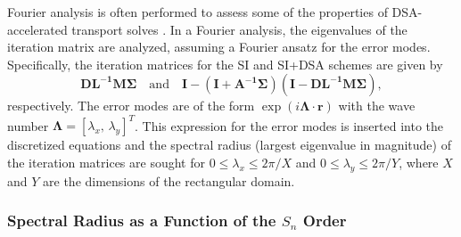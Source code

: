 \documentclass[preprint,10pt]{elsarticle}
\newcommand\bs{\boldsymbol}
\renewcommand{\(}{\left(}
\renewcommand{\)}{\right)}
\renewcommand{\[}{\left[}
\renewcommand{\]}{\right]}
\begin{document}
Fourier analysis is often performed to assess some of the properties of 
DSA-accelerated transport solves \cite{dsa_ref,larsen_dsa,consistent_p1}. In a Fourier analysis,
the eigenvalues of the iteration matrix are analyzed, assuming a Fourier ansatz for the 
error modes. Specifically, the iteration matrices for the SI and SI+DSA schemes are given by
\begin{equation}
\bs{D L^{-1}M \Sigma} \quad \text{and} \quad \bs{I}-\bs{(I+A^{-1}\Sigma)(I-D L^{-1}M \Sigma)},
\end{equation}
respectively.  The error modes are of the form $\exp(i \bs{\Lambda} \cdot \bs{r})$ with the
wave number $\bs{\Lambda}=[\lambda_x,\, \lambda_y]^T$. This expression for the error modes 
is inserted into the discretized equations and the spectral radius (largest eigenvalue in magnitude)
of the iteration matrices are sought for $0 \le \lambda_x \le 2\pi/X$ and $0 \le \lambda_y \le 2\pi/Y$,
where $X$ and $Y$ are the dimensions of the rectangular domain.


\subsubsection{Spectral Radius as a Function of the $S_n$ Order}
\end{document}
